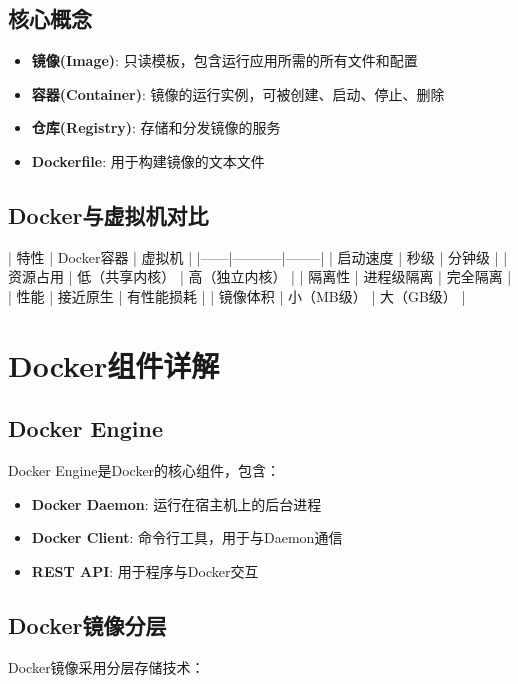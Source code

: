 \documentclass[12pt,UTF8]{ctexbook}
\begin{document}
\subsection{核心概念}

\begin{itemize}
    \item \textbf{镜像(Image)}: 只读模板，包含运行应用所需的所有文件和配置
    \item \textbf{容器(Container)}: 镜像的运行实例，可被创建、启动、停止、删除
    \item \textbf{仓库(Registry)}: 存储和分发镜像的服务
    \item \textbf{Dockerfile}: 用于构建镜像的文本文件
\end{itemize}

\subsection{Docker与虚拟机对比}

| 特性 | Docker容器 | 虚拟机 |
|------|-----------|--------|
| 启动速度 | 秒级 | 分钟级 |
| 资源占用 | 低（共享内核） | 高（独立内核） |
| 隔离性 | 进程级隔离 | 完全隔离 |
| 性能 | 接近原生 | 有性能损耗 |
| 镜像体积 | 小（MB级） | 大（GB级） |

\section{Docker组件详解}
\label{sec:docker-components}

\subsection{Docker Engine}

Docker Engine是Docker的核心组件，包含：

\begin{itemize}
    \item \textbf{Docker Daemon}: 运行在宿主机上的后台进程
    \item \textbf{Docker Client}: 命令行工具，用于与Daemon通信
    \item \textbf{REST API}: 用于程序与Docker交互
\end{itemize}

\subsection{Docker镜像分层}

Docker镜像采用分层存储技术：
\end{document}
